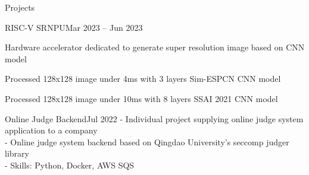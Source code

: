 \documentclass{resume}
\begin{document}
\begin{rSection}{Projects}
\begin{rSubsection}{RISC-V SRNPU}{Mar 2023 -- Jun 2023}
        \item Hardware accelerator dedicated to generate super resolution image based on CNN model

        \item Processed 128x128 image under 4ms with 3 layers Sim-ESPCN CNN model

        \item Processed 128x128 image under 10ms with 8 layers SSAI 2021 CNN model
    \end{rSubsection}

    \begin{rSubsection}{Online Judge Backend}{Jul 2022}
        - Individual project supplying online judge system application to a company \\
        - Online judge system backend based on Qingdao University's seccomp judger library \\
        - Skills: Python, Docker, AWS SQS
    \end{rSubsection}
    
\end{rSection}
\end{document}
